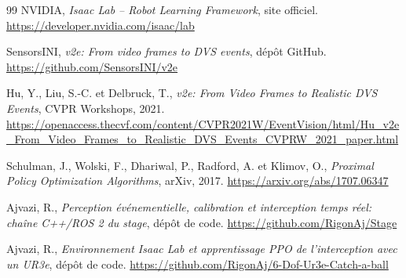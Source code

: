 \documentclass[a4paper,11pt]{report}
\begin{document}
\begin{thebibliography}{99}
NVIDIA,
\emph{Isaac Lab -- Robot Learning Framework}, site officiel.
\url{https://developer.nvidia.com/isaac/lab}

SensorsINI,
\emph{v2e: From video frames to DVS events}, dépôt GitHub.
\url{https://github.com/SensorsINI/v2e}

Hu, Y., Liu, S.-C. et Delbruck, T.,
\emph{v2e: From Video Frames to Realistic DVS Events}, CVPR Workshops, 2021.
\url{https://openaccess.thecvf.com/content/CVPR2021W/EventVision/html/Hu_v2e_From_Video_Frames_to_Realistic_DVS_Events_CVPRW_2021_paper.html}

Schulman, J., Wolski, F., Dhariwal, P., Radford, A. et Klimov, O.,
\emph{Proximal Policy Optimization Algorithms}, arXiv, 2017.
\url{https://arxiv.org/abs/1707.06347}

Ajvazi, R.,
\emph{Perception événementielle, calibration et interception temps réel: chaîne C++/ROS 2 du stage}, dépôt de code.
\url{https://github.com/RigonAj/Stage}

Ajvazi, R.,
\emph{Environnement Isaac Lab et apprentissage PPO de l'interception avec un UR3e}, dépôt de code.
\url{https://github.com/RigonAj/6-Dof-Ur3e-Catch-a-ball}

\end{thebibliography}
\end{document}
